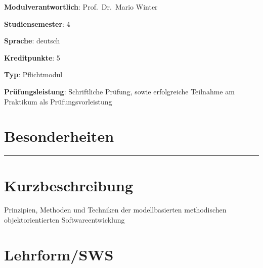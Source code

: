 \begin{modulHead}
\textbf{Modulverantwortlich}: Prof.~Dr.~Mario
Winter
\end{modulHead}
\begin{modulHead}
\textbf{Studiensemester}:
4
\end{modulHead}
\begin{modulHead}
\textbf{Sprache}:
deutsch
\end{modulHead}
\begin{modulHead}
\textbf{Kreditpunkte}:
5
\end{modulHead}
\begin{modulHead}
\textbf{Typ}:
Pflichtmodul
\end{modulHead}
\begin{modulHead}
\textbf{Prüfungsleistung}:
Schriftliche Prüfung, sowie erfolgreiche Teilnahme am Praktikum als
Prüfungsvorleistung
\end{modulHead}


\hypertarget{besonderheitenpathlabel....srcmodulbeschreibungen-bachelor-bpo5ba_softwaretechnik}{%
\section*{Besonderheiten\label{../../src/modulbeschreibungen-bachelor-bpo5/BA_Softwaretechnik}}\label{besonderheitenpathlabel....srcmodulbeschreibungen-bachelor-bpo5ba_softwaretechnik}}

\begin{center}\rule{0.5\linewidth}{0.5pt}\end{center}

\hypertarget{kurzbeschreibungpathlabel....srcmodulbeschreibungen-bachelor-bpo5ba_softwaretechnik}{%
\section*{Kurzbeschreibung\label{../../src/modulbeschreibungen-bachelor-bpo5/BA_Softwaretechnik}}\label{kurzbeschreibungpathlabel....srcmodulbeschreibungen-bachelor-bpo5ba_softwaretechnik}}

Prinzipien, Methoden und Techniken der modellbasierten methodischen
objektorientierten Softwareentwicklung

\hypertarget{lehrformswspathlabel....srcmodulbeschreibungen-bachelor-bpo5ba_softwaretechnik}{%
\section*{Lehrform/SWS\label{../../src/modulbeschreibungen-bachelor-bpo5/BA_Softwaretechnik}}\label{lehrformswspathlabel....srcmodulbeschreibungen-bachelor-bpo5ba_softwaretechnik}}

